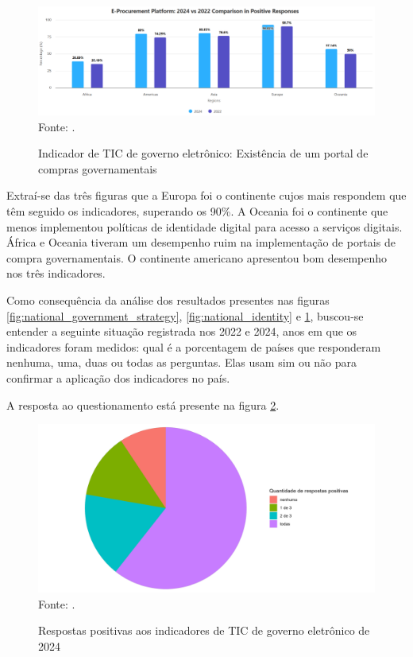 \begin{figure}[H]
	\centering
	\caption{Indicador de TIC de governo eletrônico: Existência de um portal de compras governamentais}
	\includegraphics[width=1\linewidth]{figuras/procurement_portal}
	\label{fig:procurement_portal}
	\footnotesize{Fonte: \cite{ONU_ICT_in_government_indicators}.}
\end{figure}

Extraí-se das três figuras que a Europa foi o continente cujos mais respondem que têm seguido os indicadores, superando os 90\%. A Oceania foi o continente que menos implementou políticas de identidade digital para acesso a serviços digitais. África e Oceania tiveram um desempenho ruim na implementação de portais de compra governamentais. O continente americano apresentou bom desempenho nos três indicadores.

Como consequência da análise dos resultados presentes nas figuras \ref{fig:national_government_strategy}, \ref{fig:national_identity} e \ref{fig:procurement_portal}, buscou-se entender a seguinte situação registrada nos 2022 e 2024, anos em que os indicadores foram medidos: qual é a porcentagem de países que responderam nenhuma, uma, duas ou todas as perguntas. Elas usam sim ou não para confirmar a aplicação dos indicadores no país.

A resposta ao questionamento está presente na figura \ref{fig:ticegov_soma_respostas_positivas}.

\begin{figure}[H]
	\centering
	\caption{Respostas positivas aos indicadores de TIC de governo eletrônico de 2024}
	\includegraphics[width=1\linewidth]{figuras/ticegov_soma_respostas_positivas}
	\label{fig:ticegov_soma_respostas_positivas}
	\footnotesize{Fonte: \cite{ONU_ICT_in_government_indicators}.}
\end{figure}

